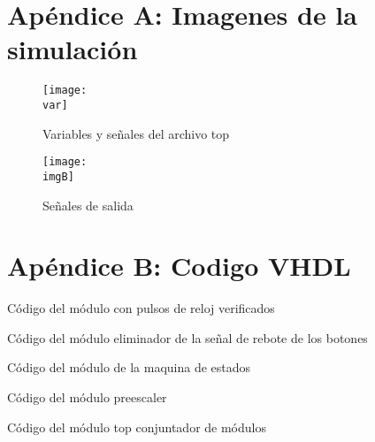 \documentclass[a4paper, 12pt]{article}
\newcommand{\var}{img/jflap.png}
\newcommand{\imgB}{img/dt2.png}
\newcommand{\codeA}{code/clock_pulse.vhd}
\newcommand{\codeB}{code/debounce.vhd}
\newcommand{\codeC}{code/doorlock.vhd}
\newcommand{\codeD}{code/frequency_divider.vhd}
\newcommand{\codeE}{code/system.vhd}
\begin{document}
    \appendix
    \section*{Apéndice A: Imagenes de la simulación}
    \begin{figure}[H]
        \centering
        \texttt{[image: \\var]}
        \caption{Variables y señales del archivo top}
        \label{fig:variables}
    \end{figure}

    \begin{figure}[H]
        \centering
        \texttt{[image: \\imgB]}
        \caption{Señales de salida}
        \label{fig:signal}
    \end{figure} 

    \section*{Apéndice B: Codigo VHDL}
    Código del módulo con pulsos de reloj verificados
    

    Código del módulo eliminador de la señal de rebote de los botones
    

    Código del módulo de la maquina de estados
    

    Código del módulo preescaler
    

    Código del módulo top conjuntador de módulos
    

    
\end{document}
